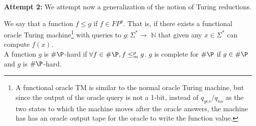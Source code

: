 \begin{description}
\item{\textbf{Attempt 2:}}
We attempt now a generalization of the notion of Turing reductions.
\begin{definition} 
	We say that a function $f \leq g$ if $f\in FP^g$. That is, if there exists a functional oracle Turing machine\footnote{A functional oracle TM is similar to the normal oracle Turing machine, but since the output of the oracle query is not a 1-bit, instead of $q_{yes}/q_{no}$ as the two states to which the machine moves after the oracle answers, the machine has has an oracle output tape for the oracle to write the function value.} 
with queries to $g:\Sigma^*\rightarrow$ $\mathbb{N}$ that given any $x\in \Sigma^*$ can compute $f(x)$. 
	\\A function $g$ is $\#\P$-hard if $\forall f\in \#\P, f\leq_m^p g$. $g$ is complete for $\#\P$ if $g \in \#\P$ and $g$ is $\#\P$-hard.
\end{definition}
\end{description}

